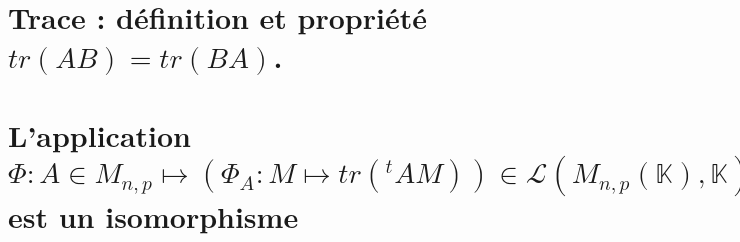 \documentclass{article}
\begin{document}
	\section{Trace : définition et propriété $tr(AB)=tr(BA)$.}
	\section{L'application $\Phi : A \in M_{n,p} \longmapsto (\Phi_A : M \mapsto tr({}^tAM))\in \mathcal L(M_{n,p}(\mathbb K), \mathbb K)$ est un isomorphisme}
\end{document}
